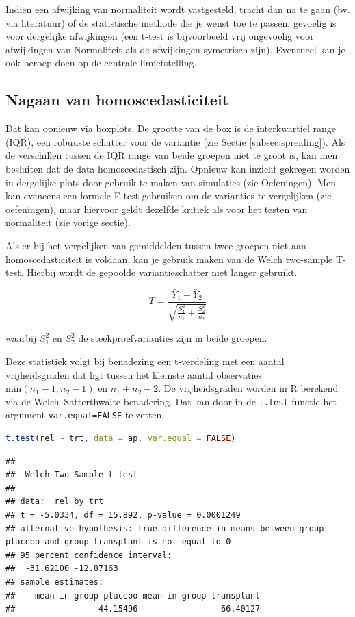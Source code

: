 \documentclass[
  12pt,dutch,coursenotes]{book}
\newcommand{\passthrough}[1]{#1}
\begin{document}
Indien een afwijking van normaliteit wordt vastgesteld, tracht dan na te gaan (bv. via literatuur) of de statistische methode die je wenst toe te passen, gevoelig is voor dergelijke afwijkingen (een t-test is bijvoorbeeld vrij ongevoelig voor afwijkingen van Normaliteit als de afwijkingen symetrisch zijn). Eventueel kan je ook beroep doen op de centrale limietstelling.

\hypertarget{nagaan-van-homoscedasticiteit}{%
\subsection{Nagaan van homoscedasticiteit}\label{nagaan-van-homoscedasticiteit}}

Dat kan opnieuw via boxplots.
De grootte van de box is de interkwartiel range (IQR), een robuuste schatter voor de variantie (zie Sectie \ref{subsec:spreiding}).
Als de verschillen tussen de IQR range van beide groepen niet te groot is, kan men besluiten dat de data homoscedastisch zijn.
Opnieuw kan inzicht gekregen worden in dergelijke plots door gebruik te maken van simulaties (zie Oefeningen).
Men kan eveneens een formele F-test gebruiken om de varianties te vergelijken (zie oefeningen), maar hiervoor geldt dezelfde kritiek als voor het testen van normaliteit (zie vorige sectie).

Als er bij het vergelijken van gemiddelden tussen twee groepen niet aan homoscedasticiteit is voldaan, kan je gebruik maken van de Welch two-sample T-test.
Hierbij wordt de gepoolde variantieschatter niet langer gebruikt.

\[T =  \frac{\bar{Y}_1 - \bar{Y}_2}{\sqrt{\frac{S^2_1}{n_1}+\frac{S^2_2}{n_2}}}\]

waarbij \(S^2_1\) en \(S^2_2\) de steekproefvarianties zijn in beide groepen.

Deze statistiek volgt bij benadering een t-verdeling met een aantal vrijheidsgraden dat ligt tussen het kleinste aantal observaties \(\text{min}(n_1-1,n_2-1)\) en \(n_1+n_2-2\).
De vrijheidsgraden worden in R berekend via de Welch--Satterthwaite benadering.
Dat kan door in de \passthrough{\lstinline!t.test!} functie het argument \passthrough{\lstinline!var.equal=FALSE!} te zetten.

\begin{lstlisting}[language=R]
t.test(rel ~ trt, data = ap, var.equal = FALSE)
\end{lstlisting}

\begin{lstlisting}
## 
##  Welch Two Sample t-test
## 
## data:  rel by trt
## t = -5.0334, df = 15.892, p-value = 0.0001249
## alternative hypothesis: true difference in means between group placebo and group transplant is not equal to 0
## 95 percent confidence interval:
##  -31.62100 -12.87163
## sample estimates:
##    mean in group placebo mean in group transplant 
##                 44.15496                 66.40127
\end{lstlisting}
\end{document}
